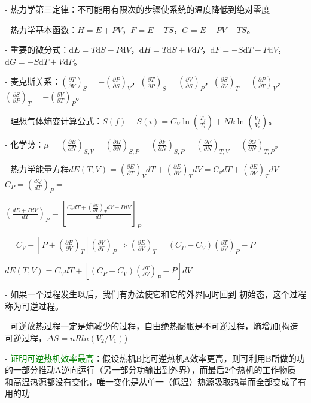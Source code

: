 \documentclass[a4paper,8pt]{extarticle} %
\newcommand{\greentext}[1]{\textcolor{green}{#1}}
\begin{document}
\begin{multicols}{3}
- 热力学第三定律：不可能用有限次的步骤使系统的温度降低到绝对零度

- 热力学基本函数：$H = E + PV$，$F = E - TS$，$G = E + PV - TS$。

- 重要的微分式：$\mathrm{d}E = T\mathrm{d}S-P\mathrm{d}V$，$\mathrm{d}H = T\mathrm{d}S+V\mathrm{d}P$，$\mathrm{d}F = -S\mathrm{d}T-P\mathrm{d}V$，$\mathrm{d}G = -S\mathrm{d}T + V\mathrm{d}P$。

- 麦克斯关系：$\left(\frac{\partial T}{\partial V}\right)_S = -\left(\frac{\partial P}{\partial S}\right)_V$，$\left(\frac{\partial T}{\partial P}\right)_S = \left(\frac{\partial V}{\partial S}\right)_P$，$\left(\frac{\partial S}{\partial V}\right)_T = \left(\frac{\partial P}{\partial T}\right)_V$，$\left(\frac{\partial S}{\partial P}\right)_T = -\left(\frac{\partial V}{\partial T}\right)_P$。

- 理想气体熵变计算公式：$S(f) - S(i) = C_V \ln\left(\frac{T_f}{T_i}\right) + Nk\ln\left(\frac{V_f}{V_i}\right)$。

- 化学势：$\mu = \left(\frac{\partial E}{\partial N}\right)_{S,V} = \left(\frac{\partial H}{\partial N}\right)_{S,P} = \left(\frac{\partial F}{\partial N}\right)_{S,P} = \left(\frac{\partial F}{\partial N}\right)_{T,V} = \left(\frac{\partial G}{\partial N}\right)_{T,P}$。

- 热力学能量方程$dE(T,V) = \left(\frac{\partial E}{\partial T}\right)_V dT + \left(\frac{\partial E}{\partial V}\right)_T dV = C_v dT + \left(\frac{\partial E}{\partial V}\right)_T dV$
$C_P = \left(\frac{dQ}{dT}\right)_P =$ 

$ \left(\frac{dE + PdV}{dT}\right)_P = \left[\frac{C_v dT + \left(\frac{\partial E}{\partial V}\right)_T dV + PdV}{dT}\right]_P$

$= C_V + \left[P + \left(\frac{\partial E}{\partial V}\right)_T\right]\left(\frac{\partial V}{\partial T}\right)_P \Rightarrow \left(\frac{\partial E}{\partial V}\right)_T = (C_P - C_V)\left(\frac{\partial T}{\partial V}\right)_P - P$

$dE(T,V) = C_V dT + \left[(C_P - C_V)\left(\frac{\partial T}{\partial V}\right)_P - P\right]dV$

- 如果一个过程发生以后，我们有办法使它和它的外界同时回到
初始态，这个过程称为可逆过程。

- 可逆放热过程一定是熵减少的过程，自由绝热膨胀是不可逆过程，熵增加(构造可逆过程，$\Delta S=nRln(V_2/V_1)$)

- \greentext{证明可逆热机效率最高}：假设热机B比可逆热机A效率更高，则可利用B所做的功的一部分推动A逆向运行（另一部分功输出到外界），而最后2个热机的工作物质
和高温热源都没有变化，唯一变化是从单一（低温）热源吸取热量而全部变成了有用的功


\end{multicols}
\end{document}
